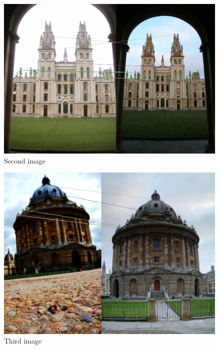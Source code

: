 \begin{figure}[h]
	\centering
        \begin{minipage}{0.9\textwidth}
        		\centering
		\includegraphics[width=\linewidth]{images/source/2}
		\caption{Second image}
		\label{fig:1b}
        \end{minipage}
\end{figure}


\begin{figure}[h]
	\centering
        \begin{minipage}{0.9\textwidth}
        		\centering
		\includegraphics[width=\linewidth]{images/source/3}
		\caption{Third image}
		\label{fig:1c}
        \end{minipage}
\end{figure}

